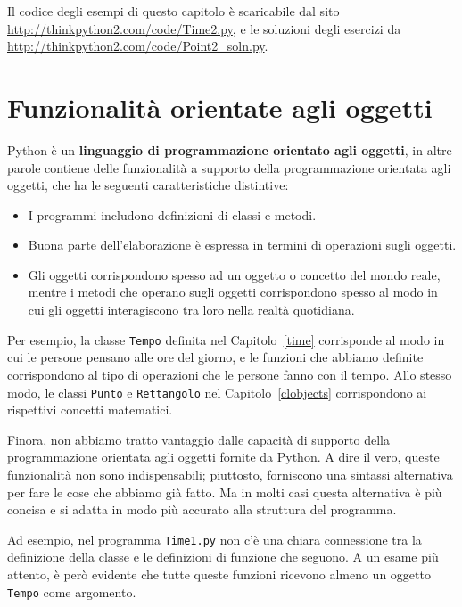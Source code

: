 \documentclass[10pt]{book}
\begin{document}
Il codice degli esempi di questo capitolo è scaricabile dal sito
\url{http://thinkpython2.com/code/Time2.py}, e le soluzioni degli esercizi da \url{http://thinkpython2.com/code/Point2_soln.py}.

\section{Funzionalità orientate agli oggetti}

Python è un {\bf linguaggio di programmazione orientato agli oggetti}, in altre parole contiene delle funzionalità a supporto della programmazione orientata agli oggetti, che ha le seguenti caratteristiche distintive:

\begin{itemize}

\item I programmi includono definizioni di classi e metodi.  

\item Buona parte dell'elaborazione è espressa in termini di operazioni sugli oggetti.

\item Gli oggetti corrispondono spesso ad un oggetto o concetto del mondo reale, mentre i metodi che operano sugli oggetti corrispondono spesso al modo in cui gli oggetti interagiscono tra loro nella realtà quotidiana.

\end{itemize}

Per esempio, la classe {\tt Tempo} definita nel Capitolo~\ref{time}
corrisponde al modo in cui le persone pensano alle ore del giorno, e le funzioni che abbiamo definite corrispondono al tipo di operazioni che le persone fanno con il tempo. Allo stesso modo, le classi {\tt Punto} e {\tt Rettangolo} nel Capitolo~\ref{clobjects} corrispondono ai rispettivi concetti matematici.

Finora, non abbiamo tratto vantaggio dalle capacità di supporto della   programmazione orientata agli oggetti fornite da Python. A dire il vero, queste funzionalità non sono indispensabili; piuttosto, forniscono una sintassi alternativa per fare le cose che abbiamo già fatto. Ma in molti casi questa alternativa è più concisa e si adatta in modo più accurato alla struttura del programma.

Ad esempio, nel programma {\tt Time1.py} non c'è una chiara connessione tra la definizione della classe e le definizioni di funzione che seguono. A un esame più attento, è però evidente che tutte queste funzioni ricevono almeno un oggetto {\tt Tempo} come argomento.
\end{document}
